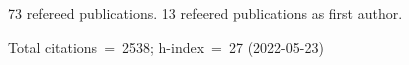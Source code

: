 73 refereed publications. 13 refeered publications as first author.

Total citations~=~2538; h-index~=~27 (2022-05-23)